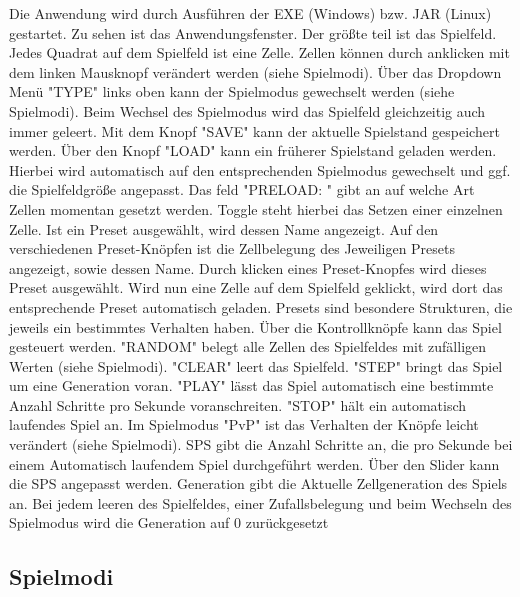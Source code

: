 \documentclass[12pt]{article}
\theoremstyle{plain}
\begin{document}
\begin{linenumbers}
Die Anwendung wird durch Ausführen der EXE (Windows) bzw. JAR (Linux) gestartet. Zu sehen ist das Anwendungsfenster.
Der größte teil ist das Spielfeld. Jedes Quadrat auf dem Spielfeld ist eine Zelle. Zellen können durch anklicken mit dem linken Mausknopf verändert werden (siehe Spielmodi).
Über das Dropdown Menü "TYPE" links oben kann der Spielmodus gewechselt werden (siehe Spielmodi). Beim Wechsel des Spielmodus wird das Spielfeld gleichzeitig auch immer geleert.
Mit dem Knopf "SAVE" kann der aktuelle Spielstand gespeichert werden. Über den Knopf "LOAD" kann ein früherer Spielstand geladen werden. Hierbei wird automatisch auf den entsprechenden Spielmodus gewechselt und ggf. die Spielfeldgröße angepasst.
Das feld "PRELOAD: " gibt an auf welche Art Zellen momentan gesetzt werden. Toggle steht hierbei das Setzen einer einzelnen Zelle. Ist ein Preset ausgewählt, wird dessen Name angezeigt.
Auf den verschiedenen Preset-Knöpfen ist die Zellbelegung des Jeweiligen Presets angezeigt, sowie dessen Name. Durch klicken eines Preset-Knopfes wird dieses Preset ausgewählt. Wird nun eine Zelle auf dem Spielfeld geklickt, wird dort das entsprechende Preset automatisch geladen. Presets sind besondere Strukturen, die jeweils ein bestimmtes Verhalten haben.
Über die Kontrollknöpfe kann das Spiel gesteuert werden. "RANDOM" belegt alle Zellen des Spielfeldes mit zufälligen Werten (siehe Spielmodi).
"CLEAR" leert das Spielfeld. "STEP" bringt das Spiel um eine Generation voran. "PLAY" lässt das Spiel automatisch eine bestimmte Anzahl Schritte pro Sekunde voranschreiten. "STOP" hält ein automatisch laufendes Spiel an. Im Spielmodus "PvP" ist das Verhalten der Knöpfe leicht verändert (siehe Spielmodi).
SPS gibt die Anzahl Schritte an, die pro Sekunde bei einem Automatisch laufendem Spiel durchgeführt werden. Über den Slider kann die SPS angepasst werden.
Generation gibt die Aktuelle Zellgeneration des Spiels an. Bei jedem leeren des Spielfeldes, einer Zufallsbelegung und beim Wechseln des Spielmodus wird die Generation auf 0 zurückgesetzt

\subsection{Spielmodi}

\end{linenumbers}
\end{document}
